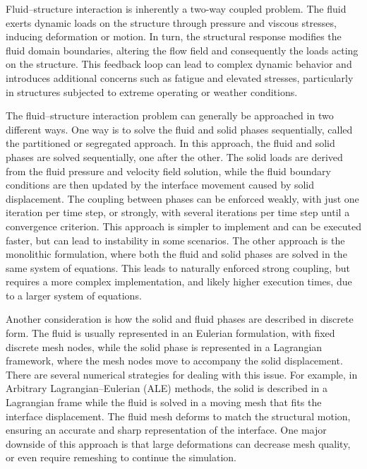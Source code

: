 \documentclass{article}
\begin{document}
Fluid–structure interaction is inherently a two-way coupled problem. The fluid exerts dynamic loads on the structure through pressure and viscous stresses, inducing deformation or motion. In turn, the structural response modifies the fluid domain boundaries, altering the flow field and consequently the loads acting on the structure. This feedback loop can lead to complex dynamic behavior and introduces additional concerns such as fatigue and elevated stresses, particularly in structures subjected to extreme operating or weather conditions.

The fluid--structure interaction problem can generally be approached in two different ways. One way is to solve the fluid and solid phases sequentially, called the partitioned or segregated approach. In this approach, the fluid and solid phases are solved sequentially, one after the other. The solid loads are derived from the fluid pressure and velocity field solution, while the fluid boundary conditions are then updated by the interface movement caused by solid displacement. The coupling between phases can be enforced weakly, with just one iteration per time step, or strongly, with several iterations per time step until a convergence criterion. This approach is simpler to implement and can be executed faster, but can lead to instability in some scenarios. The other approach is the monolithic formulation, where both the fluid and solid phases are solved in the same system of equations. This leads to naturally enforced strong coupling, but requires a more complex implementation, and likely higher execution times, due to a larger system of equations.

Another consideration is how the solid and fluid phases are described in discrete form. The fluid is usually represented in an Eulerian formulation, with fixed discrete mesh nodes, while the solid phase is represented in a Lagrangian framework, where the mesh nodes move to accompany the solid displacement. There are several numerical strategies for dealing with this issue. For example, in Arbitrary Lagrangian–Eulerian (ALE) methods, the solid is described in a Lagrangian frame while the fluid is solved in a moving mesh that fits the interface displacement. The fluid mesh deforms to match the structural motion, ensuring an accurate and sharp representation of the interface. One major downside of this approach is that large deformations can decrease mesh quality, or even require remeshing to continue the simulation.
\end{document}
